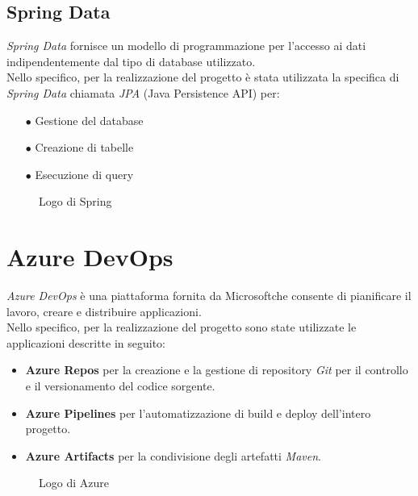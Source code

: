 \subsection{Spring Data}
\emph{Spring Data} fornisce un modello di programmazione per l’accesso ai dati indipendentemente dal tipo di database utilizzato.\\
Nello specifico, per la realizzazione del progetto è stata utilizzata la specifica di \emph{Spring Data} chiamata \emph{JPA} (Java Persistence API) per:
\begin{itemize}
	\item[$\bullet$]Gestione del database
	\item[$\bullet$]Creazione di tabelle
	\item[$\bullet$]Esecuzione di query
\end{itemize}

\begin{figure}[ht]
	\centering
	\caption{Logo di Spring}
	\label{fig:one}
\end{figure}


\section{Azure DevOps}
\emph{Azure DevOps} è una piattaforma fornita da Microsoft\texttrademark che consente di pianificare il lavoro, creare e distribuire applicazioni.\\
Nello specifico, per la realizzazione del progetto sono state utilizzate le applicazioni descritte in seguito:
\begin{itemize}
	\item \textbf{Azure Repos} per la creazione e la gestione di repository \emph{Git} per il controllo e il versionamento del codice sorgente.
	\item \textbf{Azure Pipelines} per l’automatizzazione di build e deploy dell’intero progetto.
	\item \textbf{Azure Artifacts} per la condivisione degli artefatti \emph{Maven}.
\end{itemize}
\begin{figure}[ht]
	\centering
	\caption{Logo di Azure}
	\label{fig:one}
\end{figure}
